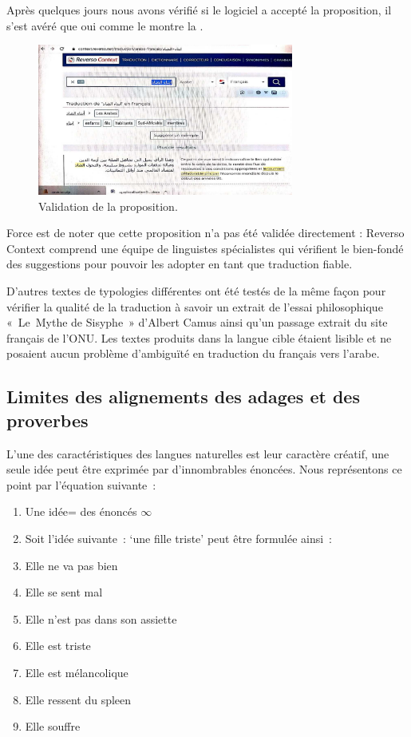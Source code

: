 \documentclass[french]{textolivre}
\begin{document}
Après quelques jours nous avons vérifié si le logiciel a accepté la proposition, il s’est avéré que oui comme le montre la . 

\begin{figure}[htbp]
 \centering
 \includegraphics[width=0.75\textwidth]{figure08.pdf}
 \caption{Validation de la proposition.}
 \label{fig-08}
\end{figure}

Force est de noter que cette proposition n’a pas été validée directement :  Reverso Context comprend une équipe de linguistes spécialistes qui vérifient le bien-fondé des suggestions pour pouvoir les adopter en tant que traduction fiable.

D’autres textes de typologies différentes ont été testés de la même façon pour vérifier la qualité de la traduction à savoir un extrait de l’essai philosophique « Le Mythe de Sisyphe » d’Albert Camus ainsi qu’un passage extrait du site français de l’ONU. Les textes produits dans la langue cible étaient lisible et ne posaient aucun problème d’ambiguïté en traduction du français vers l’arabe. 



\subsection{Limites des alignements des adages et des proverbes}\label{sec-limites}
L’une des caractéristiques des langues naturelles est leur caractère créatif, une seule idée peut être exprimée par d’innombrables énoncées. Nous représentons ce point par l’équation suivante : 

\begin{enumerate}
\item[] Une idée= des énoncés $\infty$
\item[] Soit l’idée suivante :  ‘une fille triste’ peut être formulée ainsi : 
\item Elle ne va pas bien
\item Elle se sent mal
\item Elle n’est pas dans son assiette
\item Elle est triste
\item Elle est mélancolique
\item Elle ressent du spleen
\item Elle souffre
\end{enumerate}
\end{document}
